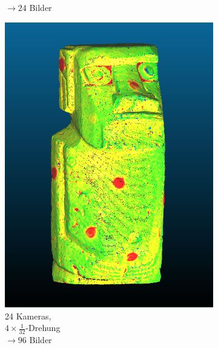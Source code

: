\documentclass[./00PhotoBox.tex]{subfiles}
\begin{document}
\begin{figure}[p]
\begin{subfigure}{0.30\textwidth}
{            $\rightarrow 24$ Bilder
        }
        \label{img:moai_normal}
    \end{subfigure}
    \begin{subfigure}{0.30\textwidth}
        \includegraphics[width=1\linewidth]{img/7_versuche/cam_anzahl/feinschritt.png}
        \centering
        \caption{
            24 Kameras,\\
            $4 \times \frac{1}{32}$-Drehung\\
            $\rightarrow 96$ Bilder
        }
        \label{img:moai_feinschritt}
    \end{subfigure}
    \begin{subfigure}{0.30\textwidth}

\end{subfigure}
\end{figure}
\end{document}
